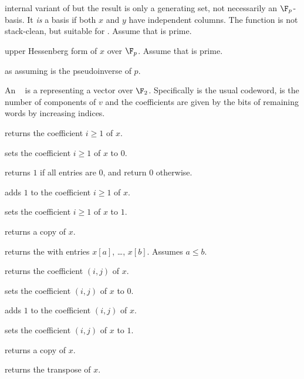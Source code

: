  internal variant of
 but the result is only a generating set, not
necessarily an $\F_p$-basis. It \emph{is} a basis if both $x$ and $y$
have independent columns. The function is not stack-clean, but
suitable for . Assume that  is prime.


 upper Hessenberg form of $x$ over $\F_p$.
Assume that  is prime.

 as 
assuming  is the pseudoinverse of $p$.

  An ~ is a
 representing a vector over $\F_2$. Specifically  is
the usual codeword,  is the number of components of $v$ and the
coefficients are given by the bits of remaining words by increasing indices.

 returns the coefficient $i\ge 1$ of $x$.

 sets the coefficient $i\ge 1$ of $x$ to
$0$.

 returns $1$ if all entries are $0$, and return
$0$ otherwise.

 adds $1$ to the coefficient $i\ge 1$ of $x$.

 sets the coefficient $i\ge 1$ of $x$ to $1$.

 returns a copy of $x$.

 returns the  with
entries $x[a]$, \dots, $x[b]$. Assumes $a \leq b$.

 returns the coefficient $(i,j)$
of $x$.

 sets the coefficient $(i,j)$ of $x$
to $0$.

 adds $1$ to the coefficient $(i,j)$
of $x$.

 sets the coefficient $(i,j)$ of $x$
to $1$.

 returns a copy of $x$.

 returns the transpose of $x$.


